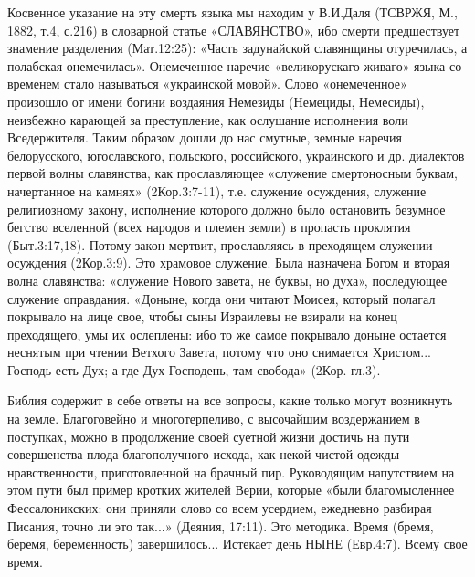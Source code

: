      Косвенное указание на эту смерть языка мы находим у В.И.Даля (ТСВРЖЯ, М., 1882, т.4, с.216) в словарной статье «СЛАВЯНСТВО», ибо смерти предшествует знамение разделения (Мат.12:25):
«Часть задунайской славянщины отуречилась, а полабская онемечилась».
Онемеченное наречие «великорускаго живаго» языка со временем стало называться «украинской мовой». Слово «онемеченное» произошло от имени богини воздаяния Немезиды (Немециды, Немесиды), неизбежно карающей за преступление, как ослушание исполнения воли Вседержителя.
     Таким образом дошли до нас смутные, земные наречия белорусского, югославского, польского, российского, украинского и др. диалектов первой волны славянства, как прославляющее «служение смертоносным буквам, начертанное на камнях» (2Кор.3:7-11), т.е. служение осуждения, служение религиозному закону, исполнение которого должно было остановить безумное бегство вселенной (всех народов и племен земли) в пропасть проклятия (Быт.3:17,18). Потому закон мертвит, прославляясь в преходящем служении осуждения (2Кор.3:9).  Это храмовое служение.
     Была назначена Богом и вторая волна славянства: «служение Нового завета, не буквы, но духа», последующее служение оправдания. «Доныне, когда они читают Моисея, который полагал покрывало на лице свое, чтобы сыны Израилевы не взирали на конец преходящего, умы их ослеплены: ибо то же самое покрывало доныне остается неснятым при чтении Ветхого Завета, потому что оно снимается Христом... 
     Господь есть Дух; а где Дух Господень, там свобода» (2Кор. гл.3).

     Библия содержит в себе ответы на все вопросы, какие только могут возникнуть на земле.
Благоговейно и многотерпеливо, с высочайшим воздержанием в поступках, можно в продолжение своей суетной жизни достичь на пути совершенства плода благополучного исхода, как некой чистой одежды нравственности, приготовленной на брачный пир. Руководящим напутствием на этом пути был пример кротких жителей Верии, которые «были благомысленнее Фессалоникских: они приняли слово со всем усердием, ежедневно разбирая Писания, точно ли это так...» (Деяния, 17:11). Это методика.
     Время (бремя, беремя, беременность) завершилось... Истекает день НЫНЕ (Евр.4:7). Всему свое время.

